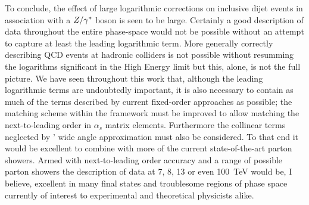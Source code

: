 To conclude, the effect of large logarithmic corrections on inclusive dijet events in association
with a $Z/\gamma^*$ boson is seen to be large.  Certainly a good description of data throughout the entire
phase-space would not be possible without an attempt to capture at least the leading logarithmic term.
More generally correctly describing QCD events at hadronic colliders is not possible without resumming
the logarithms significant in the High Energy limit but this, alone, is not the full picture.  We have
seen throughout this work that, although the leading logarithmic terms are undoubtedly important, it is
also necessary to contain as much of the terms described by current fixed-order approaches as possible;
the matching scheme within the \hej framework must be improved to allow matching the next-to-leading
order in $\alpha_s$ matrix elements.  Furthermore the collinear terms neglected by \hej' wide angle
approximation must also be considered.  To that end it would be excellent to combine \HEJ with more
of the current state-of-the-art parton showers.  Armed with next-to-leading order accuracy and a range of
possible parton showers the description of data at 7, 8, 13 or even 100~TeV would be, I believe,
excellent in many final states and troublesome regions of phase space currently of interest to
experimental and theoretical physicists alike.

